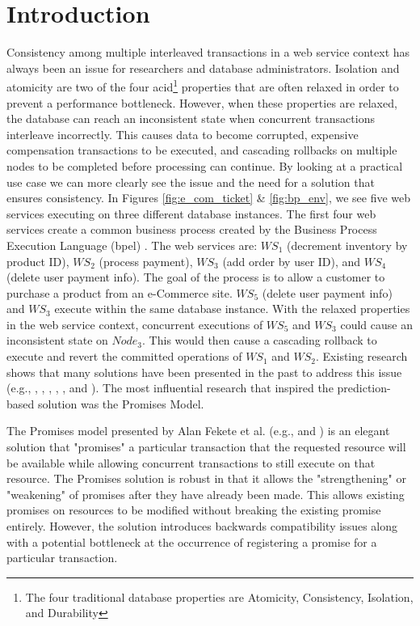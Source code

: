 \section{Introduction}
\label{pbs:introduction}
Consistency among multiple interleaved transactions in a web service context has always been an issue for researchers and database administrators. Isolation and atomicity are two of the four \gls{acid}\footnote{The four traditional database properties are Atomicity, Consistency, Isolation, and Durability} properties that are often relaxed in order to prevent a performance bottleneck. However, when these properties are relaxed, the database can reach an inconsistent state when concurrent transactions interleave incorrectly. This causes data to become corrupted, expensive compensation transactions to be executed, and cascading rollbacks on multiple nodes to be completed before processing can continue. By looking at a practical use case we can more clearly see the issue and the need for a solution that ensures consistency. In Figures \ref{fig:e_com_ticket} \& \ref{fig:bp_env}, we see five web services executing on three different database instances. The first four web services  create a common business process created by the Business Process Execution Language (\gls{bpel}) \cite{BPEL}. The web services are: $WS_{1}$ (decrement inventory by product ID), $WS_{2}$ (process payment), $WS_{3}$ (add order by user ID), and $WS_{4}$ (delete user payment info). The goal of the process is to allow a customer to purchase a product from an e-Commerce site. $WS_{5}$ (delete user payment info) and $WS_{3}$ execute within the same database instance. With the relaxed properties in the web service context, concurrent executions of $WS_{5}$ and $WS_{3}$ could cause an inconsistent state on $Node_{3}$. This would then cause a cascading rollback to execute and revert the committed operations of $WS_{1}$ and $WS_{2}$. Existing research shows that many solutions have been presented in the past to address this issue (e.g., \cite{Fekete_SnapshotIso}, \cite{Alrifai_Distributed_Managment}, \cite{Fekete_RAMP}, \cite{Fekete_IsolationSupport}, \cite{Jacobi_Locking}, and \cite{Fekete_Promises}). The most influential research that inspired the prediction-based solution was the Promises Model.

The Promises model presented by Alan Fekete et al. (e.g., \cite{Fekete_IsolationSupport} and \cite{Fekete_Promises}) is an elegant solution that "promises" a particular transaction that the requested resource will be available while allowing concurrent transactions to still execute on that resource. The Promises solution is robust in that it allows the "strengthening" or "weakening" of promises after they have already been made. This allows existing promises on resources to be modified without breaking the existing promise entirely. However, the solution introduces backwards compatibility issues along with a potential bottleneck at the occurrence of registering a promise for a particular transaction. 

